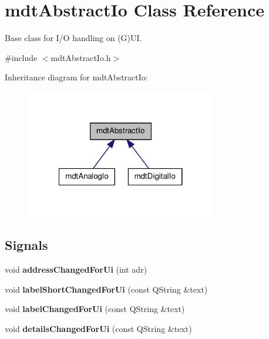 \hypertarget{classmdt_abstract_io}{
\section{mdtAbstractIo Class Reference}
\label{classmdt_abstract_io}
}


Base class for I/O handling on (G)UI.  




{\ttfamily \#include $<$mdtAbstractIo.h$>$}



Inheritance diagram for mdtAbstractIo:
\nopagebreak
\begin{figure}[H]
\begin{center}
\leavevmode
\includegraphics[width=236pt]{classmdt_abstract_io__inherit__graph}
\end{center}
\end{figure}
\subsection*{Signals}
\begin{DoxyCompactItemize}
\item 
\hypertarget{classmdt_abstract_io_a217c4fa4f4996a97f939d4066c88fffc}{
void {\bfseries addressChangedForUi} (int adr)}
\label{classmdt_abstract_io_a217c4fa4f4996a97f939d4066c88fffc}

\item 
\hypertarget{classmdt_abstract_io_aa12930a4316d7679668a07855c92e625}{
void {\bfseries labelShortChangedForUi} (const QString \&text)}
\label{classmdt_abstract_io_aa12930a4316d7679668a07855c92e625}

\item 
\hypertarget{classmdt_abstract_io_ab87859883a00193ac680c09cfef8dc84}{
void {\bfseries labelChangedForUi} (const QString \&text)}
\label{classmdt_abstract_io_ab87859883a00193ac680c09cfef8dc84}

\item 
\hypertarget{classmdt_abstract_io_aa6add53c265560420b70852ba490c2ff}{
void {\bfseries detailsChangedForUi} (const QString \&text)}
\label{classmdt_abstract_io_aa6add53c265560420b70852ba490c2ff}

\end{DoxyCompactItemize}
